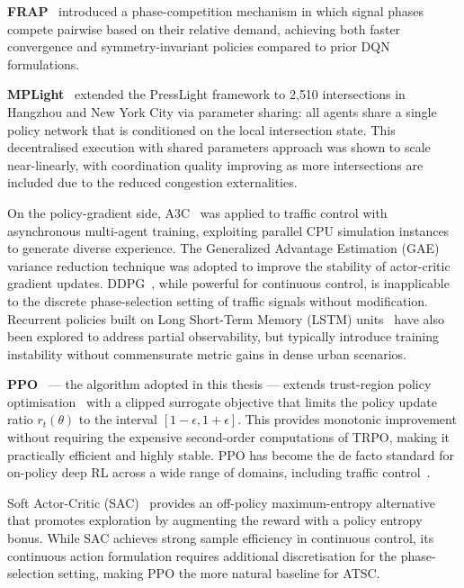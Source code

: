 \documentclass[12pt,oneside,a4paper]{report}
\begin{document}
\textbf{FRAP}~\cite{frap2019} introduced a phase-competition mechanism
in which signal phases compete pairwise based on their relative demand,
achieving both faster convergence and symmetry-invariant policies compared
to prior DQN formulations.

\textbf{MPLight}~\cite{mplight2020} extended the PressLight framework
to 2{,}510 intersections in Hangzhou and New York City via parameter
sharing: all agents share a single policy network that is conditioned
on the local intersection state.  This decentralised execution with
shared parameters approach was shown to scale near-linearly, with
coordination quality improving as more intersections are included
due to the reduced congestion externalities.

On the policy-gradient side, A3C~\cite{a3c2016} was applied to
traffic control with asynchronous multi-agent training, exploiting
parallel CPU simulation instances to generate diverse experience.
The Generalized Advantage Estimation (GAE)~\cite{gae2016} variance
reduction technique was adopted to improve the stability of
actor-critic gradient updates.  DDPG~\cite{ddpg2016}, while powerful
for continuous control, is inapplicable to the discrete phase-selection
setting of traffic signals without modification.  Recurrent policies
built on Long Short-Term Memory (LSTM) units~\cite{lstm1997} have
also been explored to address partial observability, but typically
introduce training instability without commensurate metric gains
in dense urban scenarios.

\textbf{PPO}~\cite{ppo2017} --- the algorithm adopted in this thesis
--- extends trust-region policy optimisation~\cite{trpo2015} with a
clipped surrogate objective that limits the policy update ratio
$r_t(\theta)$ to the interval $[1-\epsilon, 1+\epsilon]$.  This
provides monotonic improvement without requiring the expensive
second-order computations of TRPO, making it practically efficient
and highly stable.  PPO has become the de facto standard for
on-policy deep RL across a wide range of domains, including traffic
control~\cite{haydari2022survey}.

Soft Actor-Critic (SAC)~\cite{sac2018} provides an off-policy
maximum-entropy alternative that promotes exploration by augmenting
the reward with a policy entropy bonus.  While SAC achieves strong
sample efficiency in continuous control, its continuous action
formulation requires additional discretisation for the phase-selection
setting, making PPO the more natural baseline for ATSC.
\end{document}
